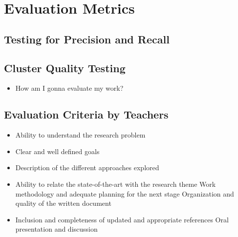 
\section{Evaluation Metrics} %
\label{sec:evaluation_metrics}

\subsection{Testing for Precision and Recall} %

\label{sub:testing_for_precision_and_recall}

\subsection{Cluster Quality Testing} %
\label{sub:cluster_quality_testing}


\begin{itemize}
  \item How am I gonna evaluate my work?
\end{itemize}

\subsection{Evaluation Criteria by Teachers} %
\label{sub:evaluation_criteria}
\begin{itemize}
  \item Ability to understand the research problem
  \item Clear and well defined goals
  \item Description of the different approaches explored
  \item Ability to relate the state-of-the-art with the research theme Work methodology and adequate planning for the next stage Organization and quality of the written document
  \item Inclusion and completeness of updated and appropriate references Oral presentation and discussion
\end{itemize}
